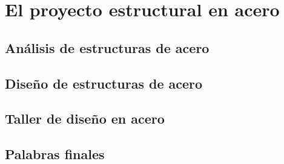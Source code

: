 %
%

\chapter{El proyecto estructural en acero}
\section{Análisis de estructuras de acero}
\section{Diseño de estructuras de acero}
\section{Taller de diseño en acero}
\section{Palabras finales}